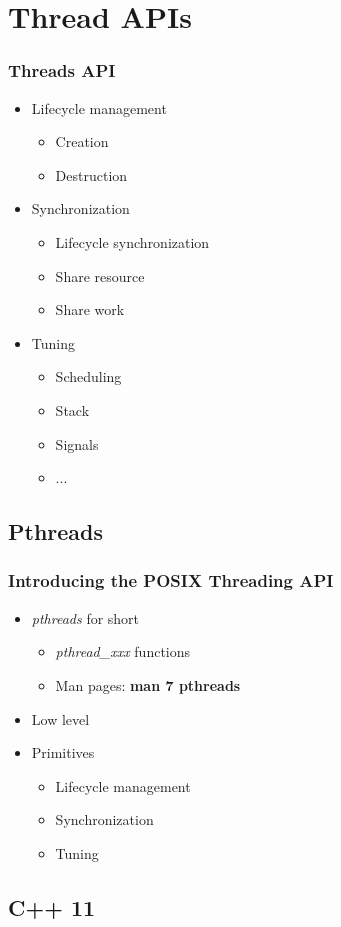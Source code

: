 \section{Thread APIs}

\begin{frame}
  \frametitle{Threads API}

  \begin{itemize}
  \item Lifecycle management
    \begin{itemize}
    \item Creation
    \item Destruction
    \end{itemize}
  \item Synchronization
    \begin{itemize}
    \item Lifecycle synchronization
    \item Share resource
    \item Share work
    \end{itemize}
  \item Tuning
    \begin{itemize}
    \item Scheduling
    \item Stack
    \item Signals
    \item ...
    \end{itemize}
  \end{itemize}
\end{frame}


\subsection{Pthreads}
\label{subsec:pthreads}

\begin{frame}
  \frametitle{Introducing the POSIX Threading API}

  \begin{itemize}
  \item \emph{pthreads} for short
    \begin{itemize}
    \item \emph{pthread\_xxx} functions
    \item Man pages: \textbf{man 7 pthreads}
    \end{itemize}
  \item Low level
  \item Primitives
    \begin{itemize}
    \item Lifecycle management
    \item Synchronization
    \item Tuning
    \end{itemize}
  \end{itemize}
\end{frame}



\subsection{C++ 11}
\label{subsec:cpp11}

